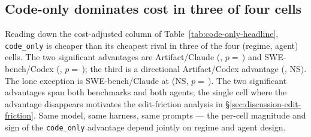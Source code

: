 
\subsection{Code-only dominates cost in three of four cells}
\label{sec:results-headline}

Reading down the cost-adjusted column of Table~\ref{tab:code-only-headline},
\texttt{code\_only} is cheaper than its cheapest rival in three
of the four (regime, agent) cells. The two significant advantages are
Artifact/Claude (,
$p=$\,)
and SWE-bench/Codex
(,
$p=$\,);
the third is a directional Artifact/Codex advantage
(, NS).
The lone exception is SWE-bench/Claude at
(NS, $p=$\,).
The two significant advantages span both benchmarks and both agents; the single
cell where the advantage disappears motivates the edit-friction analysis
in \S\ref{sec:discussion-edit-friction}. Same model, same harness, same
prompts --- the per-cell magnitude and sign of the \texttt{code\_only}
advantage depend jointly on regime and agent design.


